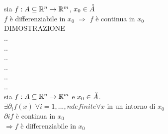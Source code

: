 \proposition
sia $f:A\subseteq \mathbb{R}^n\rightarrow \mathbb{R}^m$, $x_0\in\accentset{\circ}{A}$\\
$f$ è differenziabile in $x_0$ $\Rightarrow$ $f$ è continua in $x_0$\\
DIMOSTRAZIONE\\

..\\
..\\
..\\
..\\
..\\
..\\


sia $f:A\subseteq \mathbb{R}^n\rightarrow \mathbb{R}^m$ e $x_0\in\accentset{\circ}{A}$.\\
$\exists \partial_{i}f(x)\;\forall i=1,...,n definite \forall x$ in un intorno di $x_0$\\
$\partial{i}f$ è continua in $x_0$\\
$\Rightarrow f$ è differenziabile in $x_0$\\

